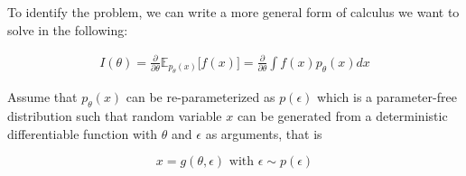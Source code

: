 To identify the problem, we can write a more general form of calculus we want to solve in the following:

\begin{equation}
\begin{aligned} \label{repa}
I(\theta) = \frac{\partial}{\partial \theta} \mathbb E_{p_{\theta}(x)} \big[ f(x)\big]= \frac{\partial}{\partial \theta} \int f(x) p_{\theta}(x) dx
\end{aligned}
\end{equation} 

Assume that $p_{\theta}(x)$ can be re-parameterized as $p(\epsilon)$ which is a parameter-free distribution such that random variable $x$ can be generated from a deterministic differentiable function with $\theta$ and $\epsilon$ as arguments, that is

\[
x = g(\theta, \epsilon)  \text{ with } \epsilon \sim p(\epsilon)
\]

